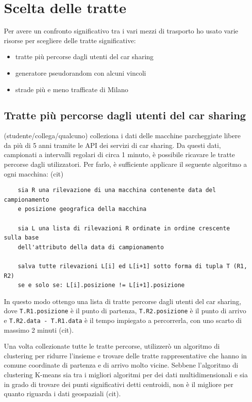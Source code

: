 \documentclass[a4paper]{report}
\begin{document}
	\section{Scelta delle tratte}
	{\large
		Per avere un confronto significativo tra i vari mezzi di trasporto ho usato varie risorse per scegliere delle tratte significative:
		\begin{itemize}
			\item tratte più percorse dagli utenti del car sharing
			\item generatore pseudorandom con alcuni vincoli
			\item strade più e meno trafficate di Milano
		\end{itemize}
	}

	\subsection{Tratte più percorse dagli utenti del car sharing}
	(studente/collega/qualcuno) colleziona i dati delle macchine parcheggiate libere da più di 5 anni tramite le API dei servizi di car sharing. Da questi dati, campionati a intervalli regolari di circa 1 minuto, è possibile ricavare le tratte percorse dagli utilizzatori. Per farlo, è sufficiente applicare il seguente algoritmo a ogni macchina: (cit)
	\begin{verbatim}
	sia R una rilevazione di una macchina contenente data del campionamento
	e posizione geografica della macchina
	
	sia L una lista di rilevazioni R ordinate in ordine crescente sulla base
	dell'attributo della data di campionamento
	
	salva tutte rilevazioni L[i] ed L[i+1] sotto forma di tupla T (R1, R2)
	se e solo se: L[i].posizione != L[i+1].posizione
	\end{verbatim}
	In questo modo ottengo una lista di tratte percorse dagli utenti del car sharing, dove \texttt{T.R1.posizione} è il punto di partenza, \texttt{T.R2.posizione} è il punto di arrivo e \texttt{T.R2.data - T.R1.data} è il tempo impiegato a percorrerla, con uno scarto di massimo 2 minuti (cit).
	
	Una volta collezionate tutte le tratte percorse, utilizzerò un algoritmo di clustering per ridurre l'insieme e trovare delle tratte rappresentative che hanno in comune coordinate di partenza e di arrivo molto vicine. Sebbene l'algoritmo di clustering K-means sia tra i migliori algoritmi per dei dati multidimensionali e sia in grado di trovare dei punti significativi detti centroidi, non è il migliore per quanto riguarda i dati geospaziali (cit).
	
\end{document}
